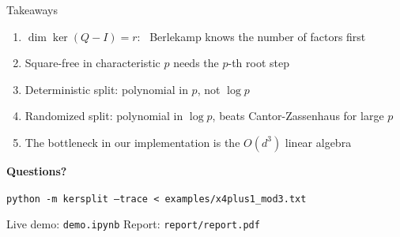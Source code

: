 \documentclass[aspectratio=169,11pt]{beamer}
\begin{document}
\begin{frame}{Takeaways}
  \begin{enumerate}
    \setlength{\itemsep}{0.8em}
    \item $\dim \ker(Q - I) = r$: \ Berlekamp knows the number of factors first
    \item Square-free in characteristic $p$ needs the $p$-th root step
    \item Deterministic split: polynomial in $p$, not $\log p$
    \item Randomized split: polynomial in $\log p$, beats Cantor-Zassenhaus for large $p$
    \item The bottleneck in our implementation is the $O(d^3)$ linear algebra
  \end{enumerate}
\end{frame}

\begin{frame}[plain]
  \vfill
  \centering
  {\fontsize{34}{38}\selectfont\bfseries\color{customblue} Questions?}\par\vspace{1.4em}
  \texttt{python -m kersplit --trace < examples/x4plus1\_mod3.txt}\par\vspace{0.6em}
  {\color{muted}\small Live demo: \texttt{demo.ipynb} \quad\textbullet\quad Report: \texttt{report/report.pdf}}
  \vfill
\end{frame}
\end{document}
